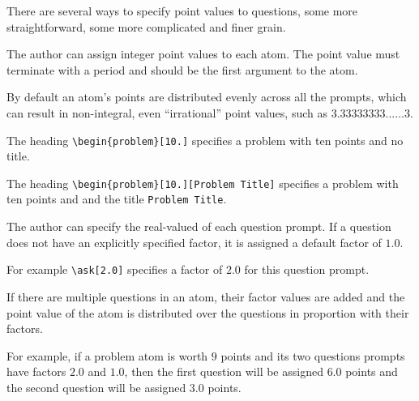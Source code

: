 %

\begin{gram}
There are several ways to specify point values to questions, some more
straightforward, some more complicated and finer grain.

The author can assign integer point values to each atom. 
%
The point value must terminate with a period and should be the first argument to the atom.
%

By default an atom's points are distributed evenly across all the
prompts, which can result in non-integral, even ``irrational'' point
values, such as $3.33333333...\ldots 3$.  
%
\end{gram}

\begin{example}
The heading
%
 \lstinline`\begin{problem}[10.]` specifies a problem with ten points
   and no title.

The heading
%
\lstinline`\begin{problem}[10.][Problem Title]` 
%
specifies a  problem with ten points and and the title
\lstinline`Problem Title`.
%
\end{example}

\begin{gram}
The author can specify the real-valued  of each question prompt.  
%
If a question does not have an explicitly specified factor, it is
assigned a default factor of $1.0$.

For example 
%
\lstinline`\ask[2.0]` 
%
specifies a factor of $2.0$ for this question prompt. 


If there are multiple questions in an atom, their factor values are
added and the point value of the atom is distributed over the
questions in proportion with their factors.

For example, if a problem atom is worth $9$ points and its two
questions prompts have factors $2.0$ and $1.0$, then the first
question will be assigned $6.0$ points and the second question will be
assigned $3.0$ points.


\end{gram}

